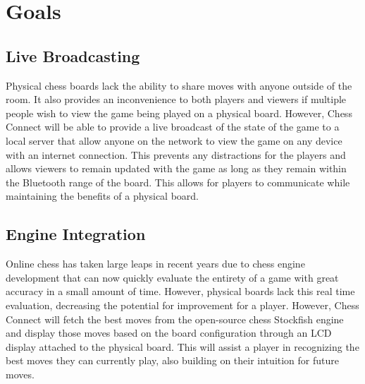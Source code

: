 \documentclass{article}
\begin{document}

\section{Goals}
\subsection{Live Broadcasting}
{Physical chess boards lack the ability to share moves with anyone outside of the room. It also provides an inconvenience to both players and viewers if multiple people wish to view the game being played on a physical board. However, Chess Connect will be able to provide a live broadcast of the state of the game to a local server that allow anyone on the network to view the game on any device with an internet connection. This prevents any distractions for the players and allows viewers to remain updated with the game as long as they remain within the Bluetooth range of the board. This allows for players to communicate while maintaining the benefits of a physical board.} 

\subsection{Engine Integration}
{Online chess has taken large leaps in recent years due to chess engine development that can now quickly evaluate the entirety of a game with great accuracy in a small amount of time. However, physical boards lack this real time evaluation, decreasing the potential for improvement for a player. However, Chess Connect will fetch the best moves from the open-source chess Stockfish engine and display those moves based on the board configuration through an LCD display attached to the physical board. This will assist a player in recognizing the best moves they can currently play, also building on their intuition for future moves.}
\end{document}
